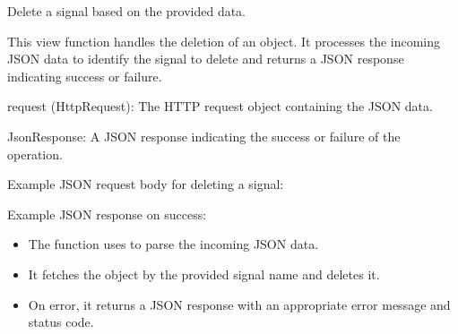 \documentclass[letterpaper,10pt,english]{sphinxmanual}
\begin{document}
\begin{fulllineitems}
\label{\detokenize{app:app.views.delete_signal}}
\pysigstartsignatures
{}
\pysigstopsignatures
\sphinxAtStartPar
Delete a signal based on the provided data.

\sphinxAtStartPar
This view function handles the deletion of an  object. 
It processes the incoming JSON data to identify the signal to delete and returns a 
JSON response indicating success or failure.
\begin{description}
\sphinxAtStartPar
request (HttpRequest): The HTTP request object containing the JSON data.

\sphinxAtStartPar
JsonResponse: A JSON response indicating the success or failure of the operation.

\sphinxAtStartPar
Example JSON request body for deleting a signal:

\begin{sphinxVerbatim}[commandchars=\\\{\}]
\end{sphinxVerbatim}

\sphinxAtStartPar
Example JSON response on success:

\begin{sphinxVerbatim}[commandchars=\\\{\}]
\end{sphinxVerbatim}

\begin{itemize}
\item {} 
\sphinxAtStartPar
The function uses  to parse the incoming JSON data.

\item {} 
\sphinxAtStartPar
It fetches the  object by the provided signal name and deletes it.

\item {} 
\sphinxAtStartPar
On error, it returns a JSON response with an appropriate error message and status code.

\end{itemize}

\end{description}

\end{fulllineitems}
\end{document}
